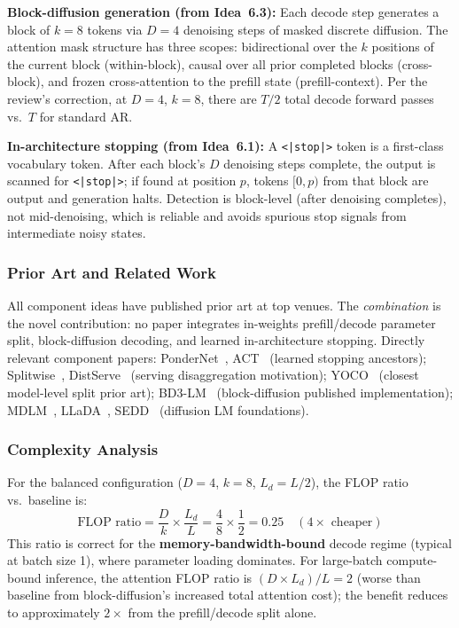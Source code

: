 \documentclass[11pt]{article}
\begin{document}
\textbf{Block-diffusion generation (from Idea~6.3):} Each decode step generates a block of $k=8$ tokens via $D=4$ denoising steps of masked discrete diffusion. The attention mask structure has three scopes: bidirectional over the $k$ positions of the current block (within-block), causal over all prior completed blocks (cross-block), and frozen cross-attention to the prefill state (prefill-context). Per the review's correction, at $D=4$, $k=8$, there are $T/2$ total decode forward passes vs.\ $T$ for standard AR.

\textbf{In-architecture stopping (from Idea~6.1):} A \texttt{<|stop|>} token is a first-class vocabulary token. After each block's $D$ denoising steps complete, the output is scanned for \texttt{<|stop|>}; if found at position $p$, tokens $[0, p)$ from that block are output and generation halts. Detection is block-level (after denoising completes), not mid-denoising, which is reliable and avoids spurious stop signals from intermediate noisy states.

\subsubsection*{Prior Art and Related Work}

All component ideas have published prior art at top venues. The \emph{combination} is the novel contribution: no paper integrates in-weights prefill/decode parameter split, block-diffusion decoding, and learned in-architecture stopping. Directly relevant component papers: PonderNet~\cite{banino2021pondernet}, ACT~\cite{graves2016act} (learned stopping ancestors); Splitwise~\cite{patel2023splitwise}, DistServe~\cite{zhong2024distserve} (serving disaggregation motivation); YOCO~\cite{sun2024yoco} (closest model-level split prior art); BD3-LM~\cite{arriola2025bd3lm} (block-diffusion published implementation); MDLM~\cite{sahoo2024mdlm}, LLaDA~\cite{nie2025llada}, SEDD~\cite{lou2024sedd} (diffusion LM foundations).

\subsubsection*{Complexity Analysis}

For the balanced configuration ($D=4$, $k=8$, $L_d = L/2$), the FLOP ratio vs.\ baseline is:
\[
\text{FLOP ratio} = \frac{D}{k} \times \frac{L_d}{L} = \frac{4}{8} \times \frac{1}{2} = 0.25 \quad (4\times \text{ cheaper})
\]
This ratio is correct for the \textbf{memory-bandwidth-bound} decode regime (typical at batch size 1), where parameter loading dominates. For large-batch compute-bound inference, the attention FLOP ratio is $(D \times L_d)/L = 2$ (worse than baseline from block-diffusion's increased total attention cost); the benefit reduces to approximately $2\times$ from the prefill/decode split alone.
\end{document}
